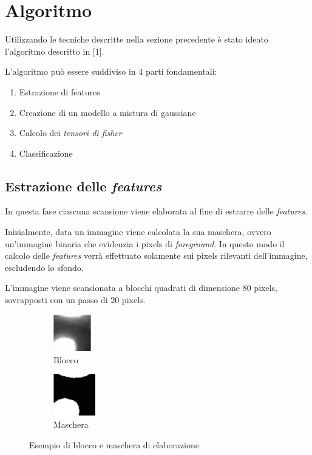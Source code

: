 \section{Algoritmo}

Utilizzando le tecniche descritte nella sezione precedente è stato ideato l'algoritmo descritto in [1].

L'algoritmo può essere suddiviso in 4 parti fondamentali:
\begin{enumerate}
\item Estrazione di features
\item Creazione di un modello a mistura di gaussiane
\item Calcolo dei \emph{tensori di fisher}
\item Classificazione
\end{enumerate}

\subsection{Estrazione delle \emph{features}}

In questa fase ciascuna scansione viene elaborata al fine di estrarre delle \emph{features}. 

Inizialmente, data un immagine viene calcolata la sua maschera, ovvero un'immagine binaria che evidenzia i pixels di \emph{foreground}. In questo modo il calcolo delle \emph{features} verrà effettuato solamente sui pixels rilevanti dell'immagine, escludendo lo sfondo.

L'immagine viene scansionata a blocchi quadrati di dimensione 80 pixels, sovrapposti con un passo di 20 pixels.

\begin{figure}[H]
\captionsetup[subfigure]{labelformat=empty}
\begin{subfigure}{.5\textwidth}
\centering
\includegraphics[height=1.6cm]{images/block.png}
\caption{Blocco}
\end{subfigure}%
\begin{subfigure}{.5\textwidth}
\centering
\includegraphics[height=1.8cm]{images/mask.png}
\caption{Maschera}
\end{subfigure}%
\caption{Esempio di blocco e maschera di elaborazione}
\end{figure}

